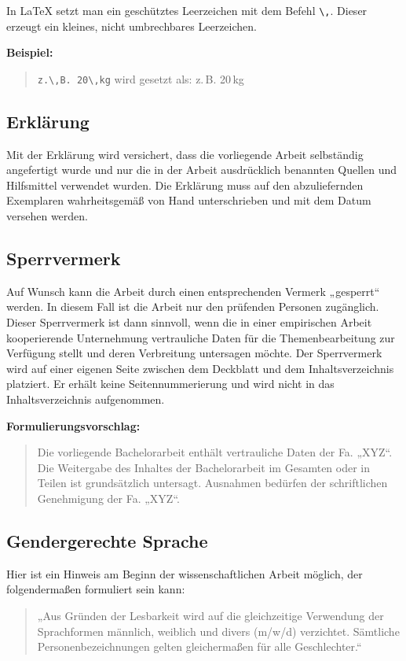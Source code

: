 In \LaTeX{} setzt man ein geschütztes Leerzeichen mit dem Befehl \verb|\,|. Dieser erzeugt ein kleines, nicht umbrechbares Leerzeichen.

\textbf{Beispiel:}
\begin{quote}
\verb|z.\,B. 20\,kg| wird gesetzt als: z.\,B. 20\,kg
\end{quote}

\subsection{Erklärung}

Mit der Erklärung wird versichert, dass die vorliegende Arbeit selbständig angefertigt wurde und nur die in der Arbeit ausdrücklich benannten Quellen und Hilfsmittel verwendet wurden. Die Erklärung muss auf den abzuliefernden Exemplaren wahrheitsgemäß von Hand unterschrieben und mit dem Datum versehen werden.

\subsection{Sperrvermerk}

Auf Wunsch kann die Arbeit durch einen entsprechenden Vermerk „gesperrt“ werden. In diesem Fall ist die Arbeit nur den prüfenden Personen zugänglich. Dieser Sperrvermerk ist dann sinnvoll, wenn die in einer empirischen Arbeit kooperierende Unternehmung vertrauliche Daten für die Themenbearbeitung zur Verfügung stellt und deren Verbreitung untersagen möchte. Der Sperrvermerk wird auf einer eigenen Seite zwischen dem Deckblatt und dem Inhaltsverzeichnis platziert. Er erhält keine Seitennummerierung und wird nicht in das Inhaltsverzeichnis aufgenommen.

\textbf{Formulierungsvorschlag:}

\begin{quote}
Die vorliegende Bachelorarbeit enthält vertrauliche Daten der Fa. „XYZ“. Die Weitergabe des Inhaltes der Bachelorarbeit im Gesamten oder in Teilen ist grundsätzlich untersagt. Ausnahmen bedürfen der schriftlichen Genehmigung der Fa. „XYZ“.
\end{quote}

\subsection{Gendergerechte Sprache}

Hier ist ein Hinweis am Beginn der wissenschaftlichen Arbeit möglich, der folgendermaßen formuliert sein kann: 
\begin{quote}
„Aus Gründen der Lesbarkeit wird auf die gleichzeitige Verwendung der Sprachformen männlich, weiblich und divers (m/w/d) verzichtet. Sämtliche Personenbezeichnungen gelten gleichermaßen für alle Geschlechter.“
\end{quote}

